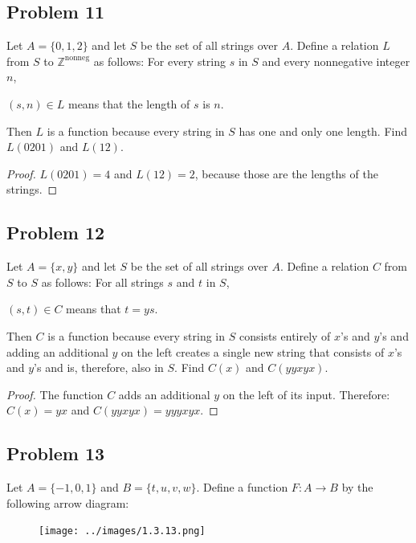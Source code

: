 \documentclass[14pt]{extarticle}
\newcommand{\Z}{\mathbb{Z}}
\begin{document}
\subsection{Problem 11}
Let $A = \{0, 1, 2\}$ and let $S$ be the set of all strings over $A$.
Define a relation $L$ from $S$ to $\Z^{\text{nonneg}}$ as follows:
For every string $s$ in $S$ and every nonnegative integer $n$,

\begin{center}
$(s, n) \in L$ means that the length of $s$ is $n$.
\end{center}

Then $L$ is a function because every string in $S$ has one and only one length.
Find $L(0201)$ and $L(12)$.

\begin{proof}
$L(0201) = 4$ and $L(12) = 2$, because those are the lengths of the strings.
\end{proof}

\subsection{Problem 12}
Let $A = \{x, y\}$ and let $S$ be the set of all strings over $A$. Define
a relation $C$ from $S$ to $S$ as follows: For all strings $s$ and $t$ in $S$,

\begin{center}
$(s, t) \in C$ means that $t = ys$.
\end{center}

Then $C$ is a function because every string in $S$ consists entirely of $x$’s
and $y$’s and adding an additional $y$ on the left creates a single new string
that consists of $x$’s and $y$’s and is, therefore, also in $S$.
Find $C(x)$ and $C(yyxyx)$.

\begin{proof}
The function $C$ adds an additional $y$ on the left of its input. Therefore:
$C(x) = yx$ and $C(yyxyx) = yyyxyx$.
\end{proof}

\subsection{Problem 13}
Let $A = \{-1, 0, 1\}$ and $B = \{t, u, v, w\}$. Define a function $F: A \to B$
by the following arrow diagram:

\begin{figure}[ht!]
\centering
\texttt{[image: ../images/1.3.13.png]}
\end{figure}
\end{document}
